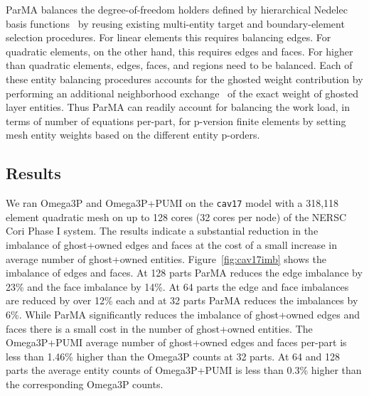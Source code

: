 \documentclass[review,12pt]{elsarticle_summary_report}
\begin{document}
ParMA balances the degree-of-freedom holders defined by 
hierarchical Nedelec basis functions~\cite{ingelstrom2006new,ko2010advances} by
reusing existing multi-entity target and boundary-element selection
procedures.
For linear elements this requires balancing edges. For quadratic elements, on the other hand, this requires edges and faces. For higher than quadratic elements, edges, faces, and
regions need to be balanced.
Each of these entity balancing procedures accounts for the ghosted weight
contribution by performing an additional neighborhood
exchange~\cite{ibanez2014hybrid} of the exact weight of ghosted layer entities.
Thus ParMA can readily account for balancing the work load, in terms of number
of equations per-part, for p-version finite elements by setting mesh entity
weights based on the different entity p-orders. 

\subsection{\label{load_balance_results} Results}

We ran Omega3P and Omega3P+PUMI on the \texttt{cav17} model with a 318,118
element quadratic mesh on up to 128 cores (32 cores per node) of the NERSC Cori
Phase I system. The results indicate a substantial reduction in the imbalance of ghost+owned edges and faces at the cost of a small increase in average number of ghost+owned entities.
Figure~\ref{fig:cav17imb} shows the imbalance of edges and faces.
At 128 parts ParMA reduces the edge imbalance by 23\%  and the face
imbalance by 14\%.
At 64 parts the edge and face imbalances are reduced by over 12\% each and
at 32 parts ParMA reduces the imbalances by 6\%.
While ParMA significantly reduces the imbalance of ghost+owned edges and faces
there is a small cost in the number of ghost+owned entities.
The Omega3P+PUMI average number of ghost+owned edges and faces per-part
is less than 1.46\% higher than the Omega3P counts at 32 parts.
At 64 and 128 parts the average entity counts of Omega3P+PUMI is less than 0.3\%
higher than the corresponding Omega3P counts.
\end{document}
